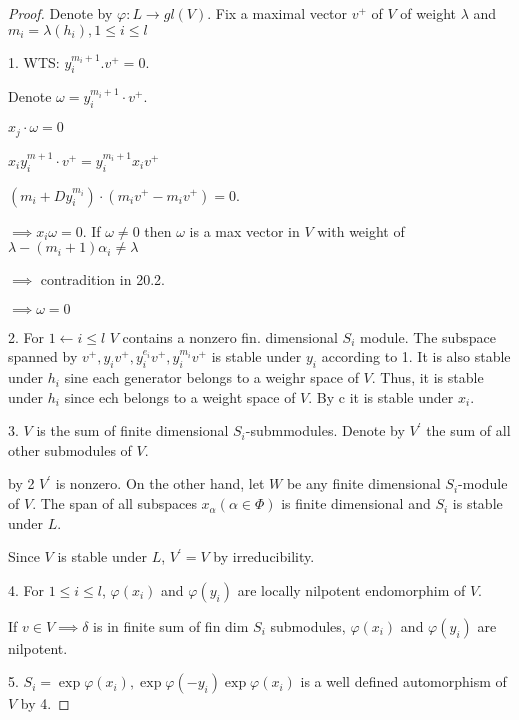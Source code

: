 \documentclass{article}
\theoremstyle{definition}
\begin{document}
    \begin{proof}
        Denote by \(\varphi : L \to gl(V)\). Fix a maximal vector \(v^+\) of \(V\) of weight \(\lambda\) and \(m_i = \lambda(h_i), 1 \leq i \leq l\)

        1. WTS: \(y_i^{m_i + 1} . v^+ = 0\).

        Denote \(\omega = y_i^{m_i + 1} \cdot v^+\).

        \(x_j \cdot \omega = 0\) 

        \(x_i y_i^{m+1} \cdot v^+ = y_i^{m_i+1} x_i v^+\)

        \((m_i + D y_i^{m_i}) \cdot (m_i v^+ - m_i v^+) = 0\).
        
        \(\implies x_i \omega = 0\). If \(\omega \neq 0\) then \(\omega\) is a max vector in \(V\) with weight of \(\lambda - (m_i + 1) \alpha_i \neq \lambda\)

        \(\implies\) contradition in 20.2.

        \(\implies \omega = 0\) 

        2. For \(1 \leftarrow i \leq l\) \(V\) contains a nonzero fin. dimensional \(S_i \) module. The subspace spanned by \(v^+, y_i v^+, y_i^{e_i} v^+, y_i^{m_i}v^+\) is stable under \(y_i\) according to 1. It is also stable under \(h_i\) sine each generator belongs to a weighr space of \(V\). Thus, it is stable under \(h_i\) since ech belongs to a weight space of \(V\). By c it is stable under \(x_i\).
        
        3. \(V\) is the sum of finite dimensional \(S_i\)-submmodules. Denote by \(V^{\prime}\) the sum of all other submodules of \(V\).

        by 2 \(V^{\prime}\) is nonzero. On the other hand, let \(W\) be any finite dimensional \(S_i\)-module of \(V\). The span of all subspaces \(x_\alpha (\alpha \in \Phi)\) is finite dimensional and \(S_i\) is stable under \(L\).
        
        Since \(V\) is stable under \(L\), \(V^{\prime} = V\) by irreducibility.

        4. For \(1 \leq i \leq l\), \(\varphi (x_i)\) and \(\varphi(y_i)\) are locally nilpotent endomorphim of \(V\).
        
        If \(v\in V \implies \delta\) is in finite sum of fin dim \(S_i\) submodules, \(\varphi(x_i)\) and \(\varphi(y_i)\) are nilpotent.

        5. \(S_i = \exp \varphi (x_i), \exp \varphi (-y_i) \exp \varphi(x_i)\) is a well defined automorphism of \(V\) by 4.
        

\end{proof}
\end{document}
